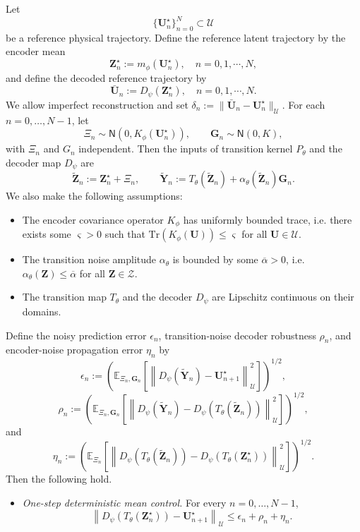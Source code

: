 \documentclass[11pt]{article}
\newcommand{\ol}{\overline}
\begin{document}
\begin{proposition}
\label{prop:encoder-noisy-rollout-bound}
Let
\[
\{\mathbf U^\star_n\}_{n=0}^N\subset\mathcal U
\]
be a reference physical trajectory. Define the reference latent trajectory by the encoder mean
\[
\mathbf Z_n^\star := m_\phi(\mathbf U^\star_n),\quad n=0,1,\cdots,N,
\]
and define the decoded reference trajectory by
\[
\bar{\mathbf U}_n := D_\psi(\mathbf Z_n^\star),\quad n=0,1,\cdots,N.
\]
We allow imperfect reconstruction and set $\delta_n := \|\bar{\mathbf U}_n-\mathbf U_n^\star\|_{\mathcal U}$. For each $n=0,\ldots,N-1$, let
\[
\Xi_n\sim\mathsf N(0,K_\phi(\mathbf U^\star_n)),
\qquad
\mathbf G_n\sim\mathsf N(0,K),
\]
with $\Xi_n$ and $G_n$ independent. Then the inputs of transition kernel $P_\theta$ and the decoder map $D_\psi$ are
\[
\widetilde{\mathbf Z}_n := \mathbf Z_n^\star+\Xi_n,\qquad
\widetilde{\mathbf Y}_n
:=T_\theta(\widetilde{\mathbf Z}_n)+\alpha_\theta(\widetilde{\mathbf Z}_n)\mathbf G_n .
\]
We also make the following assumptions:
\begin{itemize}[itemsep=-2pt, topsep=0pt]
    \item[(i)] The encoder covariance operator $K_\phi$ has uniformly bounded trace, i.e.  there exists some $\varsigma>0$ such that $\mathrm{Tr}(K_\phi(\mathbf{U}))\leq\varsigma$ for all $\mathbf U\in\mathcal{U}$.
    \item[(ii)] The transition noise amplitude $\alpha_\theta$ is  bounded by some $\ol\alpha>0$, i.e. $\alpha_\theta(\mathbf Z)\leq\ol\alpha$ for all $\mathbf Z\in\mathcal Z$.
    \item[(iii)] The transition map $T_\theta$ and the decoder $D_\psi$ are Lipschitz continuous on their domains.
\end{itemize}
Define the noisy prediction error $\epsilon_n$, transition-noise decoder robustness $\rho_n$, and encoder-noise propagation error $\eta_n$ by
\[
\epsilon_n:=\left(\mathbb E_{\Xi_n,\mathbf G_n}
\left[\left\|D_\psi(\widetilde{\mathbf Y}_n)-\mathbf U^\star_{n+1}
\right\|_{\mathcal U}^2\right]\right)^{1/2},
\]
\[
\rho_n:=\left(\mathbb E_{\Xi_n,\mathbf G_n}
\left[\left\|D_\psi(\widetilde{\mathbf Y}_n)-D_\psi\left(T_\theta(\widetilde{\mathbf Z}_n)\right)
\right\|_{\mathcal U}^2\right]\right)^{1/2},
\]
and
\[
\eta_n:=\left(\mathbb E_{\Xi_n}
\left[\left\|D_\psi\left(T_\theta(\widetilde{\mathbf Z}_n)\right)
-D_\psi\left(T_\theta(\mathbf Z_n^\star)\right)
\right\|_{\mathcal U}^2\right]\right)^{1/2}.
\]
Then the following hold.
\begin{itemize}[topsep=0pt, itemsep=0pt]
\item[(a)]\textit{One-step deterministic mean control.}
For every $n=0,\ldots,N-1$,
\[
\left\|
D_\psi\left(T_\theta(\mathbf Z_n^\star)\right)-\mathbf U^\star_{n+1}
\right\|_{\mathcal U}
\le\epsilon_n+\rho_n+\eta_n .
\]


\end{itemize}
\end{proposition}
\end{document}
